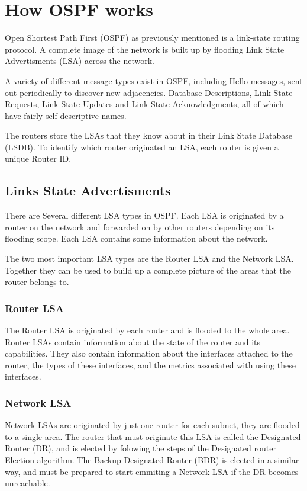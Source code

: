 \documentclass[12pt]{report}
\begin{document}
\section{How OSPF works}
Open Shortest Path First (OSPF) as previously mentioned is a link-state routing 
protocol. A complete image of the network is built up by flooding Link State 
Advertisments (LSA) across the network. 

A variety of different message types exist in OSPF, including Hello messages, sent 
out periodically to discover new adjacencies. Database Descriptions, Link State 
Requests, Link State Updates and Link State Acknowledgments, all of which have 
fairly self descriptive names.

The routers store the LSAs that they know about in their Link State Database (LSDB). 
To identify which router originated an LSA, each router is given a unique Router ID.

\subsection{Links State Advertisments}
There are Several different LSA types in OSPF. Each LSA is originated by a router on 
the network and forwarded on by other routers depending on its flooding scope. Each 
LSA contains some information about the network. 
 
The two most important LSA types are the Router LSA and the Network LSA. Together 
they can be used to build up a complete picture of the areas that the router belongs 
to. 

\subsubsection{Router LSA}
The Router LSA is originated by each router and is flooded to the whole area. Router 
LSAs contain information about the state of the router and its capabilities. They 
also contain information about the interfaces attached to the router, the types of 
these interfaces, and the metrics associated with using these interfaces. 

\subsubsection{Network LSA}
Network LSAs are originated by just one router for each subnet, they are flooded to 
a single area. The router that must originate this LSA is called the Designated 
Router (DR), and is elected by folowing the steps of the Designated router Election 
algorithm. The Backup Designated Router (BDR) is elected in a similar way, and must 
be prepared to start emmiting a Network LSA if the DR becomes unreachable. 
\end{document}

